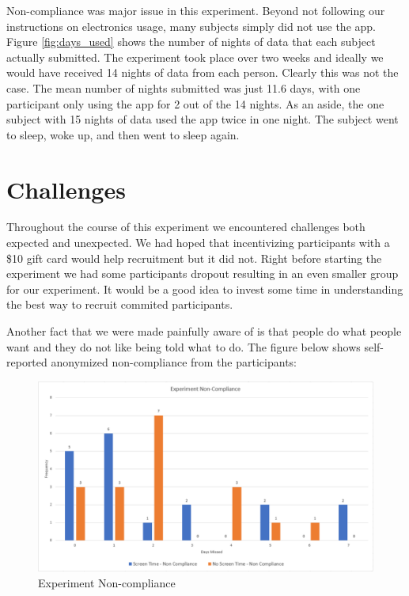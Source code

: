 \documentclass[12pt,]{article}
\begin{document}
Non-compliance was major issue in this experiment. Beyond not following
our instructions on electronics usage, many subjects simply did not use
the app. Figure \ref{fig:days_used} shows the number of nights of data
that each subject actually submitted. The experiment took place over two
weeks and ideally we would have received 14 nights of data from each
person. Clearly this was not the case. The mean number of nights
submitted was just 11.6 days, with one participant only using the app
for 2 out of the 14 nights. As an aside, the one subject with 15 nights
of data used the app twice in one night. The subject went to sleep, woke
up, and then went to sleep again.

\section{Challenges}\label{challenges}

Throughout the course of this experiment we encountered challenges both
expected and unexpected. We had hoped that incentivizing participants
with a \$10 gift card would help recruitment but it did not. Right
before starting the experiment we had some participants dropout
resulting in an even smaller group for our experiment. It would be a
good idea to invest some time in understanding the best way to recruit
commited participants.

Another fact that we were made painfully aware of is that people do what
people want and they do not like being told what to do. The figure below
shows self-reported anonymized non-compliance from the participants:

\begin{figure}[H]

{\centering \includegraphics[width=1\linewidth]{img/compliance} 

}

\caption{Experiment Non-compliance}\label{fig:noncompliance}
\end{figure}
\end{document}
